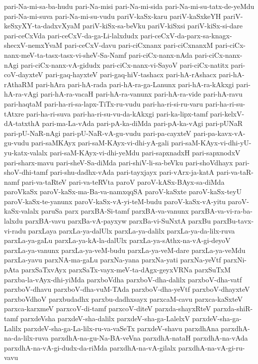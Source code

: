 {pari-Na-mi-sa-ba-hudu
pari-Na-misi
pari-Na-mi-sida
pari-Na-mi-su-tatx-de-yeMdu
pari-Na-mi-suva
pari-Na-mi-su-vudu
pariV-kaSx-karu
pariV-kaSxkeYH
pariV-keSxyXY-ta-dadxvXyaM
pariV-kiSx-sa-beVku
pariV-kiSxsi
pariV-kiSx-si-dare
pari-ceCxVda
pari-ceCxV-da-ga-Li-lalxdudx
pari-ceCxV-da-parx-sa-knagx-shecxV-nemxYvaM
pari-ceCxV-davu
pari-ciCxnanx
pari-ciCxnanxM
pari-ciCx-nanx-meV-ta-tasx-tasx-vi-sheV-Sa-Namf
pari-ciCx-nanx-nAda
pari-ciCx-nanx-nAgi
pari-ciCx-nanx-vA-gidudx
pari-ciCx-nanx-vi-SayoV
pari-ciCx-natitx
pari-coV-dayxteV
pari-gaq-hayxteV
pari-gaq-hiV-tashacx
pari-hA-rAshacx
pari-hA-rAthaRM
pari-hAra
pari-hA-rada
pari-hA-ra-ga-Lanunx
pari-hA-ra-kAkxgi
pari-hA-ra-vAgi
pari-hA-ra-vacaH
pari-hA-ra-vanunx
pari-hA-ra-vide
pari-hA-ravu
pari-haqtaM
pari-ha-ri-sa-lapx-TiTx-ru-vudu
pari-ha-ri-si-ru-varu
pari-ha-ri-su-tAtxre
pari-ha-ri-suva
pari-ha-ri-su-vu-da-kAkxgi
pari-ka-lipx-tamf
pari-kelxV-dA-tatxthA
pari-ma-La-vAda
pari-pA-ka-diMda
pari-pA-ka-vAgi
pari-pUNaR
pari-pU-NaR-nAgi
pari-pU-NaR-vA-gu-vudu
pari-pa-cayxteV
pari-pa-kavx-vA-gu-vudu
pari-saMKAyx
pari-saM-KAyx-vi-dhi-yA-gali
pari-saM-KAyx-vi-dhi-yU-yu-katx-valalx
pari-saM-KAyx-vi-dhi-yeMdu
pari-sapxnadxH
pari-sapxnodxV
pari-sharx-mavu
pari-sheV-Sa-diMda
pari-shiV-li-sa-beVku
pari-shoVdhayx
pari-shoV-dhi-tamf
pari-shu-dadhx-vAda
pari-tayxjayx
pari-vArx-ja-katA
pari-va-taR-namf
pari-va-taRteV
pari-va-teRVta
paroV
paroV-kASx-BAyx-sa-diMda
paroVkaSx
paroV-kaSx-ma-Ba-va-namxqqSA
paroV-kaSxte
paroV-kaSx-teyU
paroV-kaSx-te-yanunx
paroV-kaSx-vA-yi-teM-budu
paroV-kaSx-vA-yitu
paroV-kaSx-valalx
paruSa
parx
parxBA-Si-tamf
parxBA-va-vanunx
parxBA-va-vi-ra-ba-lalxdu
parxBA-vavu
parxBa-vA-payxyw
parxBa-vi-SuNxtA
parxBu
parxBu-tavx-vi-radu
parxLaya
parxLa-ya-dalUlx
parxLa-ya-dalilx
parxLa-ya-da-lilx-ruva
parxLa-ya-gaLu
parxLa-ya-kA-la-dalUlx
parxLa-ya-sAthx-na-vA-gi-deyoV
parxLa-ya-vanunx
parxLa-ya-veM-budu
parxLa-ya-veM-dare
parxLa-ya-veMdu
parxLa-yavu
parxNA-ma-gaLu
parxNa-yana
parxNa-yati
parxNa-yeVtf
parxNi-pAta
parxSaTxvAyx
parxSaTx-vayx-meV-ta-dAgx-geyxVRNa
parxSuTxM
parxba-la-vAyx-dhi-yiMda
parxboVdha
parxboV-dha-dalilx
parxboV-dha-vatf
parxboV-dhavu
parxboV-dha-vuM-TAda
parxboV-dha-yeVtf
parxboV-dhayxteV
parxboVdhoV
parxbudadhx
parxbu-dadhxsayx
parxcaM-cavu
parxca-kaSxteV
parxca-karxmeV
parxcoV-di-tamf
parxcoV-diteV
parxda-shayxRteV
parxda-shiR-tamf
parxdeVsha
parxdeV-sha-dalilx
parxdeV-sha-ga-LalelxV
parxdeV-sha-ga-Lalilx
parxdeV-sha-ga-La-lilx-ru-va-vaSeTx
parxdeV-shavu
parxdhAna
parxdhA-na-da-lilx-ruva
parxdhA-na-gu-Na-BA-veVna
parxdhA-nataH
parxdhA-na-vAda
parxdhA-na-vA-gi-dudx-da-riMda
parxdhA-na-vA-gilalx
parxdhA-na-vA-gi-ru-vavu
}

